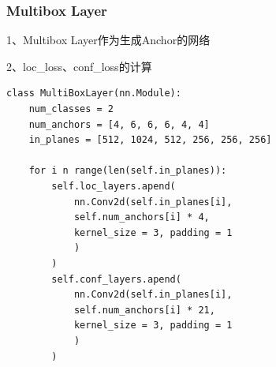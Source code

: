 \subsubsection{Multibox Layer}
1、Multibox Layer作为生成Anchor的网络

2、loc\_loss、conf\_loss的计算

\begin{lstlisting}[caption={Multibox layer}]
class MultiBoxLayer(nn.Module):
	num_classes = 2
	num_anchors = [4, 6, 6, 6, 4, 4]
	in_planes = [512, 1024, 512, 256, 256, 256]
	
	for i n range(len(self.in_planes)):
		self.loc_layers.apend(
			nn.Conv2d(self.in_planes[i],
			self.num_anchors[i] * 4,
			kernel_size = 3, padding = 1
			)
		)
		self.conf_layers.apend(
			nn.Conv2d(self.in_planes[i],
			self.num_anchors[i] * 21,
			kernel_size = 3, padding = 1
			)
		)
\end{lstlisting}